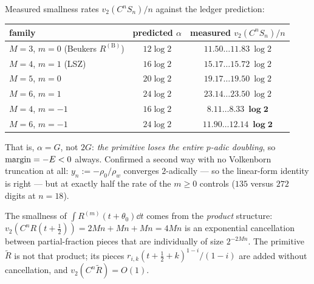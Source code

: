 \begin{finding}[$m=-1$ is dead]\label{find:mminus1}
 Measured smallness rates $v_2(C^nS_n)/n$ against
the ledger prediction:
\begin{center}
\scriptsize\setlength{\tabcolsep}{4pt}
\begin{tabular}{lcc}
\toprule
family & predicted $\alpha$ & measured $v_2(C^nS_n)/n$\\
\midrule
$M=3$, $m=0$ (Beukers $R^{(\mathrm B)}$) & $12\log2$ & $11.50\dots11.83\ \log2$\\
$M=4$, $m=1$ (LSZ) & $16\log2$ & $15.17\dots15.72\ \log2$\\
$M=5$, $m=0$ & $20\log2$ & $19.17\dots19.50\ \log2$\\
$M=6$, $m=1$ & $24\log2$ & $23.14\dots23.50\ \log2$\\
\midrule
$M=4$, $m=-1$ & $16\log2$ & $\mathbf{8.11\dots8.33\ \log2}$\\
$M=6$, $m=-1$ & $24\log2$ & $\mathbf{11.90\dots12.14\ \log2}$\\
\bottomrule
\end{tabular}
\end{center}
That is, $\alpha=G$, not $2G$: \emph{the primitive loses the entire $p$-adic doubling}, so
$\operatorname{margin}=-E<0$ always. Confirmed a second way with no Volkenborn truncation at all:
$y_n:=-\rho_0/\rho_w$ converges $2$-adically --- so the linear-form identity is right --- but
at exactly half the rate of the $m\ge0$ controls ($135$ versus $272$ digits at $n=18$).
\end{finding}

\begin{proposition}\label{prop:whymminus1}
\PROVED{} The smallness of $\int R^{(m)}(t+\theta_0)\dd t$ comes from the \emph{product}
structure: $v_2(C^nR(t+\tfrac12))=2Mn+Mn+Mn=4Mn$ is an exponential cancellation between
partial-fraction pieces that are individually of size $2^{-2Mn}$. The primitive
$\widetilde R$ is not that product; its pieces $r_{i,k}(t+\tfrac12+k)^{1-i}/(1-i)$ are added
without cancellation, and $v_2(C^n\widetilde R)=O(1)$.
\end{proposition}

\begin{center}\end{center}

